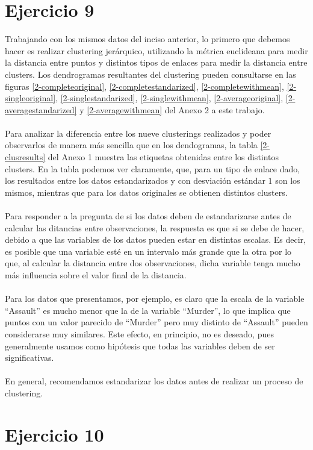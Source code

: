 \documentclass[11pt]{article}
\begin{document}
\section{Ejercicio 9}
Trabajando con los mismos datos del inciso anterior, lo primero que debemos hacer es realizar clustering jerárquico, utilizando la métrica euclideana para medir la distancia entre puntos y distintos tipos de enlaces para medir la distancia entre clusters. Los dendrogramas resultantes del clustering pueden consultarse en las figuras 
\ref{2-completeoriginal}, \ref{2-completestandarized}, \ref{2-completewithmean}, \ref{2-singleoriginal}, \ref{2-singlestandarized}, \ref{2-singlewithmean}, \ref{2-averageoriginal}, \ref{2-averagestandarized} y  \ref{2-averagewithmean} del Anexo 2 a este trabajo.
\\
\\Para analizar la diferencia entre los nueve clusterings realizados y poder observarlos de manera más sencilla que en los dendogramas, la tabla \ref{2-clusresults} del Anexo 1 muestra las etiquetas obtenidas entre los distintos clusters. En la tabla podemos ver claramente, que, para un tipo de enlace dado, los resultados entre los datos estandarizados y con desviación estándar $1$ son los mismos, mientras que para los datos originales se obtienen distintos clusters. 
\\
\\Para responder a la pregunta de si los datos deben de estandarizarse antes de calcular las ditancias entre observaciones, la respuesta es que si se debe de hacer, debido a que las variables de los datos pueden estar en distintas escalas. Es decir, es posible que una variable esté en un intervalo más grande que la otra por lo que, al calcular la distancia entre dos observaciones, dicha variable tenga mucho más influencia sobre el valor final de la distancia.
\\
\\Para los datos que presentamos, por ejemplo, es claro que la escala de la variable  ``Assault'' es mucho menor que la de la variable ``Murder'', lo que implica que puntos con un valor parecido de ``Murder'' pero muy distinto de ``Assault'' pueden considerarse muy similares. Este efecto, en principio, no es deseado, pues generalmente usamos como hipótesis que todas las variables deben de ser significativas. 
\\
\\En general, recomendamos estandarizar los datos antes de realizar un proceso de clustering.
\section{Ejercicio 10}
\end{document}
